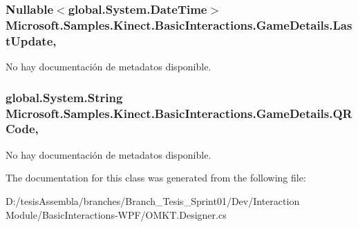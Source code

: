 \hypertarget{class_microsoft_1_1_samples_1_1_kinect_1_1_basic_interactions_1_1_game_details_a4d984899a56fbee62959435eefb21b83}{
\subsubsection[{Last\-Update}]{\setlength{\rightskip}{0pt plus 5cm}Nullable$<$global.\-System.\-Date\-Time$>$ Microsoft.\-Samples.\-Kinect.\-Basic\-Interactions.\-Game\-Details.\-Last\-Update\hspace{0.3cm}{\ttfamily [get]}, {\ttfamily [set]}}}\label{class_microsoft_1_1_samples_1_1_kinect_1_1_basic_interactions_1_1_game_details_a4d984899a56fbee62959435eefb21b83}


No hay documentación de metadatos disponible. 

\hypertarget{class_microsoft_1_1_samples_1_1_kinect_1_1_basic_interactions_1_1_game_details_af8d26ff07f2f2a17c2fde020f803489f}{
\subsubsection[{Q\-R\-Code}]{\setlength{\rightskip}{0pt plus 5cm}global.\-System.\-String Microsoft.\-Samples.\-Kinect.\-Basic\-Interactions.\-Game\-Details.\-Q\-R\-Code\hspace{0.3cm}{\ttfamily [get]}, {\ttfamily [set]}}}\label{class_microsoft_1_1_samples_1_1_kinect_1_1_basic_interactions_1_1_game_details_af8d26ff07f2f2a17c2fde020f803489f}


No hay documentación de metadatos disponible. 



The documentation for this class was generated from the following file\-:\begin{DoxyCompactItemize}
\item 
D\-:/tesis\-Assembla/branches/\-Branch\-\_\-\-Tesis\-\_\-\-Sprint01/\-Dev/\-Interaction Module/\-Basic\-Interactions-\/\-W\-P\-F/O\-M\-K\-T.\-Designer.\-cs\end{DoxyCompactItemize}
